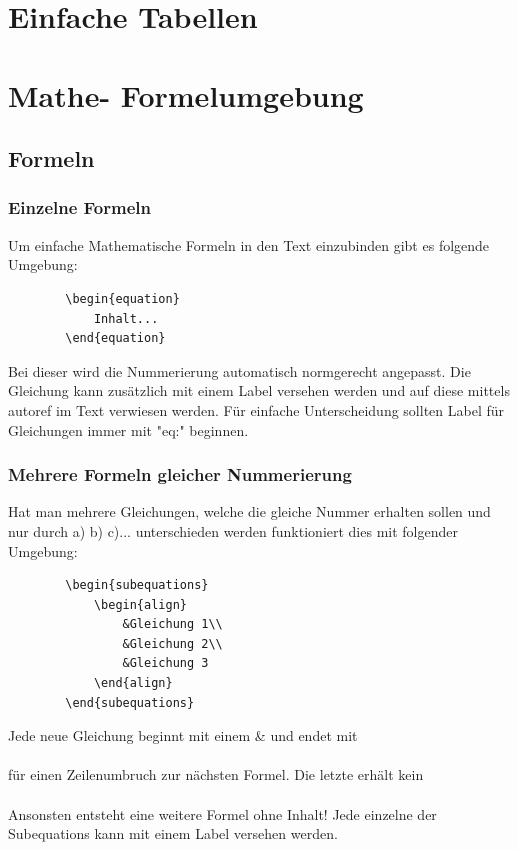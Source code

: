 	
	
	\newpage
	\section{Einfache Tabellen}




	
	\newpage
	\section{Mathe- Formelumgebung}
	\subsection{Formeln}
	\subsubsection{Einzelne Formeln}
	Um einfache Mathematische Formeln in den Text einzubinden gibt es folgende Umgebung:
	\begin{verbatim}
		\begin{equation}
			Inhalt...
		\end{equation}
	\end{verbatim}
	Bei dieser wird die Nummerierung automatisch normgerecht angepasst. Die Gleichung kann zusätzlich mit einem Label versehen werden und auf diese mittels autoref im Text verwiesen werden. Für einfache Unterscheidung sollten Label für Gleichungen immer mit "eq:" beginnen.
	\subsubsection{Mehrere Formeln gleicher Nummerierung}
	Hat man mehrere Gleichungen, welche die gleiche Nummer erhalten sollen und nur durch a) b) c)... unterschieden werden funktioniert dies mit folgender Umgebung:
	\begin{verbatim}
		\begin{subequations}
			\begin{align}
				&Gleichung 1\\
				&Gleichung 2\\
				&Gleichung 3
			\end{align}
		\end{subequations}
	\end{verbatim}
	Jede neue Gleichung beginnt mit einem \& und endet mit \\\\ für einen Zeilenumbruch zur nächsten Formel. Die letzte erhält kein \\\\ Ansonsten entsteht eine weitere Formel ohne Inhalt! \newline
	Jede einzelne der Subequations kann mit einem Label versehen werden.
